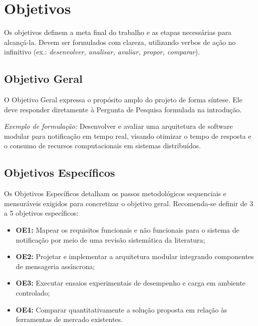 \section{Objetivos}
\label{sec:objetivos}

Os objetivos definem a meta final do trabalho e as etapas necessárias para alcançá-la. Devem ser formulados com clareza, utilizando verbos de ação no infinitivo (ex.: \textit{desenvolver, analisar, avaliar, propor, comparar}).

\subsection{Objetivo Geral}
\label{sub:objetivogeral}

O Objetivo Geral expressa o propósito amplo do projeto de forma síntese. Ele deve responder diretamente à Pergunta de Pesquisa formulada na introdução.

\textit{Exemplo de formulação:} Desenvolver e avaliar uma arquitetura de software modular para notificação em tempo real, visando otimizar o tempo de resposta e o consumo de recursos computacionais em sistemas distribuídos.

\subsection{Objetivos Específicos}
\label{sub:objetivosespecifos}

Os Objetivos Específicos detalham os passos metodológicos sequenciais e mensuráveis exigidos para concretizar o objetivo geral. Recomenda-se definir de 3 a 5 objetivos específicos:

\begin{itemize}
    \item \textbf{OE1:} Mapear os requisitos funcionais e não funcionais para o sistema de notificação por meio de uma revisão sistemática da literatura;
    \item \textbf{OE2:} Projetar e implementar a arquitetura modular integrando componentes de mensageria assíncrona;
    \item \textbf{OE3:} Executar ensaios experimentais de desempenho e carga em ambiente controlado;
    \item \textbf{OE4:} Comparar quantitativamente a solução proposta em relação às ferramentas de mercado existentes.
\end{itemize}